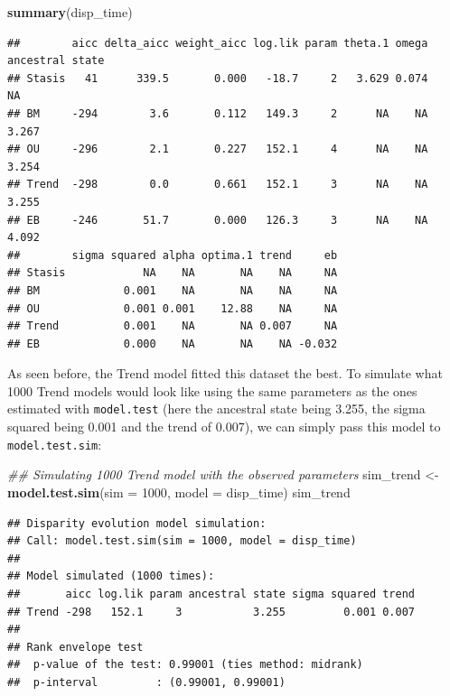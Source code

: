 \documentclass[]{book}
\newenvironment{Shaded}{\begin{snugshade}}{\end{snugshade}}
\newcommand{\CommentTok}[1]{\textcolor[rgb]{0.56,0.35,0.01}{\textit{#1}}}
\newcommand{\DataTypeTok}[1]{\textcolor[rgb]{0.13,0.29,0.53}{#1}}
\newcommand{\DecValTok}[1]{\textcolor[rgb]{0.00,0.00,0.81}{#1}}
\newcommand{\KeywordTok}[1]{\textcolor[rgb]{0.13,0.29,0.53}{\textbf{#1}}}
\newcommand{\NormalTok}[1]{#1}
\newcommand{\StringTok}[1]{\textcolor[rgb]{0.31,0.60,0.02}{#1}}
\begin{document}
\begin{Shaded}
\begin{Highlighting}[]
\KeywordTok{summary}\NormalTok{(disp_time)}
\end{Highlighting}
\end{Shaded}

\begin{verbatim}
##        aicc delta_aicc weight_aicc log.lik param theta.1 omega ancestral state
## Stasis   41      339.5       0.000   -18.7     2   3.629 0.074              NA
## BM     -294        3.6       0.112   149.3     2      NA    NA           3.267
## OU     -296        2.1       0.227   152.1     4      NA    NA           3.254
## Trend  -298        0.0       0.661   152.1     3      NA    NA           3.255
## EB     -246       51.7       0.000   126.3     3      NA    NA           4.092
##        sigma squared alpha optima.1 trend     eb
## Stasis            NA    NA       NA    NA     NA
## BM             0.001    NA       NA    NA     NA
## OU             0.001 0.001    12.88    NA     NA
## Trend          0.001    NA       NA 0.007     NA
## EB             0.000    NA       NA    NA -0.032
\end{verbatim}

As seen before, the Trend model fitted this dataset the best.
To simulate what 1000 Trend models would look like using the same parameters as the ones estimated with \texttt{model.test} (here the ancestral state being 3.255, the sigma squared being 0.001 and the trend of 0.007), we can simply pass this model to \texttt{model.test.sim}:

\begin{Shaded}
\begin{Highlighting}[]
\CommentTok{## Simulating 1000 Trend model with the observed parameters}
\NormalTok{sim_trend <-}\StringTok{ }\KeywordTok{model.test.sim}\NormalTok{(}\DataTypeTok{sim =} \DecValTok{1000}\NormalTok{, }\DataTypeTok{model =}\NormalTok{ disp_time)}
\NormalTok{sim_trend}
\end{Highlighting}
\end{Shaded}

\begin{verbatim}
## Disparity evolution model simulation:
## Call: model.test.sim(sim = 1000, model = disp_time) 
## 
## Model simulated (1000 times):
##       aicc log.lik param ancestral state sigma squared trend
## Trend -298   152.1     3           3.255         0.001 0.007
## 
## Rank envelope test
##  p-value of the test: 0.99001 (ties method: midrank)
##  p-interval         : (0.99001, 0.99001)
\end{verbatim}
\end{document}
